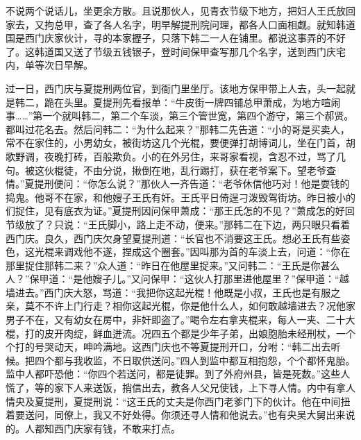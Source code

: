不说两个说话儿，坐更余方散。且说那伙人，见青衣节级下地方，把妇人王氏放回家去，又拘总甲，查了各人名字，明早解提刑院问理，都各人口面相觑。就知韩道国是西门庆家伙计，寻的本家攊子，只落下韩二一人在铺里。都说这事弄的不好了。这韩道国又送了节级五钱银子，登时间保甲查写那几个名字，送到西门庆宅内，单等次日早解。

过一日，西门庆与夏提刑两位官，到衙门里坐厅。该地方保甲带上人去，头一起就是韩二，跪在头里。夏提刑先看报单：“牛皮街一牌四铺总甲萧成，为地方喧闹事……”第一个就叫韩二，第二个车淡，第三个管世宽，第四个游守，第三个郝贤。都叫过花名去。然后问韩二：“为什么起来？”那韩二先告道：“小的哥是买卖人，常不在家住的，小男幼女，被街坊这几个光棍，要便弹打胡博词儿，坐在门首，胡歌野调，夜晚打砖，百般欺负。小的在外另住，来哥家看视，含忍不过，骂了几句。被这伙棍徒，不由分说，揪倒在地，乱行踢打，获在老爷案下。望老爷查情。”夏提刑便问：“你怎么说？”那伙人一齐告道：“老爷休信他巧对！他是耍钱的捣鬼。他哥不在家，和他嫂子王氏有奸。王氏平日倚逞刁泼毁驾街坊。昨日被小的们捉住，见有底衣为证。”夏提刑因问保甲萧成：“那王氏怎的不见？”萧成怎的好回节级放了？只说：“王氏脚小，路上走不动，便来。”那韩二在下边，两只眼只看着西门庆。良久，西门庆欠身望夏提刑道：“长官也不消要这王氏。想必王氏有些姿色，这光棍来调戏他不遂，捏成这个圈套。”因叫那为首的车淡上去，问道：“你在那里捉住那韩二来？”众人道：“昨日在他屋里捉来。”又问韩二：“王氏是你甚么人？”保甲道：“是他嫂子儿。”又问保甲：“这伙人打那里进他屋里？”保甲道：“越墙进去。”西门庆大怒，骂道：“我把你这起光棍！他既是小叔，王氏也是有服之亲，莫不不许上门行走？相你这起光棍，你是他什么人，如何敢越墙进去？况他家男子不在，又有幼女在房中，非奸即盗了。”喝令左右拿夹棍来，每人一夹、二十大棍，打的皮开肉绽，鲜血迸流。况四五个都是少年子弟，出娘胞胎未经刑杖，一个个打的号哭动天，呻吟满地。这西门庆也不等夏提刑开口，分咐：“韩二出去听候。把四个都与我收监，不日取供送问。”四人到监中都互相抱怨，个个都怀鬼胎。监中人都吓恐他：“你四个若送问，都是徒罪。到了外府州县，皆是死数。”这些人慌了，等的家下人来送饭，捎信出去，教各人父兄使钱，上下寻人情。内中有拿人情央及夏提刑，夏提刑说：“这王氏的丈夫是你西门老爹门下的伙计。他在中间扭着要送问，同僚上，我又不好处得。你须还寻人情和他说去。”也有央吴大舅出来说的。人都知西门庆家有钱，不敢来打点。

